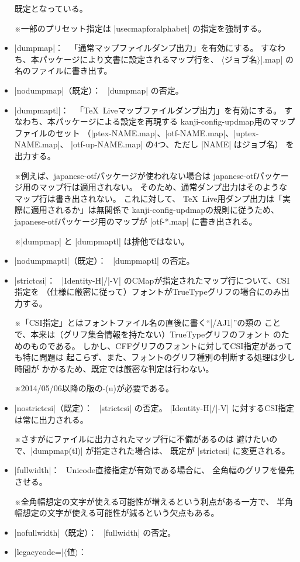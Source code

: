 \documentclass[uplatex,dvipdfmx,a4paper]{jsarticle}
\newcommand{\Pkg}[1]{\textsf{#1}}
\newcommand{\Meta}[1]{$\langle$\mbox{}#1\mbox{}$\rangle$}
\newcommand{\Note}{\par\noindent ※}
\newcommand{\Means}{：\ }
\providecommand{\Strong}[1]{\textsf{#1}}
\begin{document}
\begin{itemize}
  既定となっている。
  \Note 一部のプリセット指定は |usecmapforalphabet| の指定を強制する。
\item |dumpmap|\Means
  「通常マップファイルダンプ出力」を有効にする。
  すなわち、本パッケージにより文書に設定されるマップ行を、
  \Meta{ジョブ名}|.map| の名のファイルに書き出す。
\item |nodumpmap|（既定）\Means
  |dumpmap| の否定。
\item |dumpmaptl|\Means
  「{\TeX}~Liveマップファイルダンプ出力」を有効にする。
  すなわち、本パッケージによる設定を再現する
  kanji-config-updmap用のマップファイルのセット
  （|ptex-NAME.map|、|otf-NAME.map|、|uptex-NAME.map|、
  |otf-up-NAME.map| の4つ、ただし |NAME| はジョブ名）
  を出力する。
  \Note 例えば、\Pkg{japanese-otf}パッケージが使われない場合は
  \Pkg{japanese-otf}パッケージ用のマップ行は適用されない。
  そのため、通常ダンプ出力はそのようなマップ行は書き出されない。
  これに対して、
  {\TeX}\ Live用ダンプ出力は「実際に適用されるか」は無関係で
  kanji-config-updmapの規則に従うため、
  \Pkg{japanese-otf}パッケージ用のマップが |otf-*.map| に書き出される。
  \Note |dumpmap| と |dumpmaptl| は排他では\Strong{ない}。
\item |nodumpmaptl|（既定）\Means
  |dumpmaptl| の否定。
\item |strictcsi|\Means
  |Identity-H|/|-V| のCMapが指定されたマップ行について、CSI指定を
  （仕様に厳密に従って）フォントがTrueTypeグリフの場合にのみ出力する。
  \Note 「CSI指定」とはフォントファイル名の直後に書く“|/AJ1|”の類の
    ことで、本来は（グリフ集合情報を持たない）TrueTypeグリフのフォント
    のためのものである。
    しかし、CFFグリフのフォントに対してCSI指定があっても特に問題は
    起こらず、また、フォントのグリフ種別の判断する処理は少し時間が
    かかるため、既定では厳密な判定は行わない。
  \Note 2014/05/06以降の版の{\logoe-(u)\pTeX}が必要である。
\item |nostrictcsi|（既定）\Means
  |strictcsi| の否定。
  |Identity-H|/|-V| に対するCSI指定は常に出力される。
  \Note さすがにファイルに出力されたマップ行に不備があるのは
    避けたいので、|dumpmap(tl)| が指定された場合は、
    既定が |strictcsi| に変更される。
\item |fullwidth|\Means
  Unicode直接指定が有効である場合に、
  全角幅のグリフを優先させる。
  \Note 全角幅想定の文字が使える可能性が増えるという利点がある一方で、
  半角幅想定の文字が使える可能性が減るという欠点もある。
\item |nofullwidth|（既定）\Means
  |fullwidth| の否定。
\item |legacycode=|\Meta{値}\Means

\end{itemize}
\end{document}
